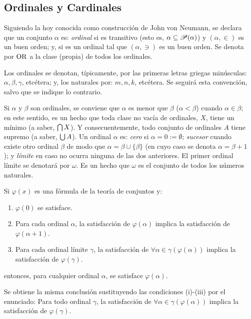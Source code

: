     \subsection{Ordinales y Cardinales}

    \index[sym]{$\OR$}
    Siguiendo la hoy conocida como construcción de John von Neumann, se declara que un conjunto $\alpha$ es: \textit{ordinal} si es transitivo (esto es, $\alpha \subseteq \mathscr{P}(\alpha)$) y $(\alpha,\in)$ es un buen orden; y,  si es un ordinal tal que $(\alpha,\ni)$ es un buen orden. Se denota por $\OR$ a la clase (propia) de todos los ordinales.

    Los ordinales se denotan, típicamente, por las primeras letras griegas minúsculas: $\alpha, \beta, \gamma$, etcétera; y, los naturales por: $m,n,k$, etcétera. Se seguirá esta convención, salvo que se indique lo contrario.

    \index[sym]{$\omega$}\index[sym]{$\alpha < \beta$}
    Si $\alpha$ y $\beta$ son ordinales, se conviene que $\alpha$ es menor que $\beta$ ($\alpha<\beta$) cuando $\alpha \in \beta$; en este sentido, es un hecho que toda clase no vacía de ordinales, $X$, tiene un mínimo (a saber, $\mbox{$\bigcap$}\, X$). Y consecuentemente, todo conjunto de ordinales $A$ tiene supremo (a saber, $\mbox{$\bigcup$}\, A$). Un ordinal $\alpha$ es: \textit{cero} si $\alpha=0:=\emptyset$; \textit{sucesor} cuando existe otro ordinal $\beta$ de modo que $\alpha = \beta \cup \{\beta\}$ (en cuyo caso se denota $\alpha=\beta+1$); y \textit{límite} en caso no ocurra ninguna de las dos anteriores. El primer ordinal límite se denotará por $\omega$. Es un hecho que $\omega$ es el conjunto de todos los números naturales.

    \begin{teorema}
        Si $\varphi(x)$ es una fórmula de la teoría de conjuntos y:
        \begin{enumerate}
            \item $\varphi(0)$ se satisface.
            \item Para cada ordinal $\alpha$, la satisfacción de $\varphi(\alpha)$ implica la satisfacción de $\varphi(\alpha+1)$.
            \item Para cada ordinal límite $\gamma$, la satisfacción de $\forall \alpha \in \gamma (\varphi(\alpha))$ implica la satisfacción de $\varphi(\gamma)$.
        \end{enumerate}
        entonces, para cualquier ordinal $\alpha$, se satisface $\varphi(\alpha)$.

        Se obtiene la misma conclusión sustituyendo las condiciones (i)-(iii) por el enunciado: Para todo ordinal $\gamma$, la satisfacción de $\forall \alpha \in \gamma (\varphi(\alpha))$ implica la satisfacción de $\varphi(\gamma)$.
    \end{teorema}

